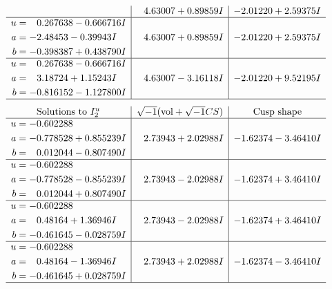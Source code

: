 \documentclass[1p]{elsarticle_modified}
\theoremstyle{definition}
\newcommand{\I}{\sqrt{-1}}
\begin{document}
$$\begin{array}{c|c|c}
 & \phantom{-}4.63007 + 0.89859 I & -2.01220 + 2.59375 I \\ \hline\begin{aligned}
u &= \phantom{-}0.267638 - 0.666716 I \\
a &= -2.48453 - 0.39943 I \\
b &= -0.398387 + 0.438790 I\end{aligned}
 & \phantom{-}4.63007 + 0.89859 I & -2.01220 + 2.59375 I \\ \hline\begin{aligned}
u &= \phantom{-}0.267638 - 0.666716 I \\
a &= \phantom{-}3.18724 + 1.15243 I \\
b &= -0.816152 - 1.127800 I\end{aligned}
 & \phantom{-}4.63007 - 3.16118 I & -2.01220 + 9.52195 I\\
 \hline 
 \end{array}$$\newpage$$\begin{array}{c|c|c}  
\text{Solutions to }I^u_{2}& \I (\text{vol} + \sqrt{-1}CS) & \text{Cusp shape}\\
 \hline 
\begin{aligned}
u &= -0.602288\phantom{ +0.000000I} \\
a &= -0.778528 + 0.855239 I \\
b &= \phantom{-}0.012044 - 0.807490 I\end{aligned}
 & \phantom{-}2.73943 + 2.02988 I & -1.62374 - 3.46410 I \\ \hline\begin{aligned}
u &= -0.602288\phantom{ +0.000000I} \\
a &= -0.778528 - 0.855239 I \\
b &= \phantom{-}0.012044 + 0.807490 I\end{aligned}
 & \phantom{-}2.73943 - 2.02988 I & -1.62374 + 3.46410 I \\ \hline\begin{aligned}
u &= -0.602288\phantom{ +0.000000I} \\
a &= \phantom{-}0.48164 + 1.36946 I \\
b &= -0.461645 - 0.028759 I\end{aligned}
 & \phantom{-}2.73943 - 2.02988 I & -1.62374 + 3.46410 I \\ \hline\begin{aligned}
u &= -0.602288\phantom{ +0.000000I} \\
a &= \phantom{-}0.48164 - 1.36946 I \\
b &= -0.461645 + 0.028759 I\end{aligned}
 & \phantom{-}2.73943 + 2.02988 I & -1.62374 - 3.46410 I\\
 \hline 
 \end{array}$$\newpage\newpage\renewcommand{\arraystretch}{1}
\end{document}
